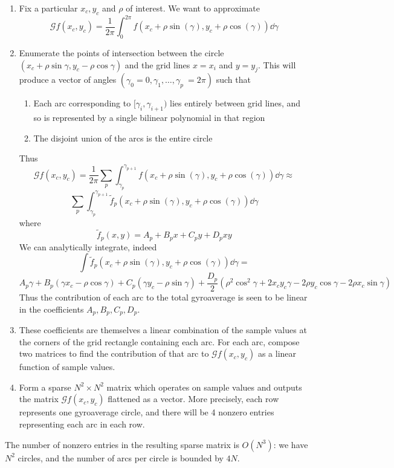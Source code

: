 \begin{enumerate}
	\item Fix a particular $x_c, y_c$ and $\rho$ of interest.  We want to approximate
\[	\mathcal{G}f(x_c,y_c) =  \frac{1}{2 \pi}\int_{0}^{2\pi} f(x_c+\rho \sin(\gamma), y_c + \rho \cos(\gamma)) \dd{\gamma} \]
\item Enumerate the points of intersection between the circle $(x_c + \rho \sin \gamma, y_c - \rho \cos \gamma)$ and the grid lines $x=x_i$ and $y=y_j$.  This will produce a vector of angles $(\gamma_0=0, \gamma_1, \dotsc, \gamma_p \ = 2 \pi)$  such that
\begin{enumerate}
	\item Each arc corresponding to $[\gamma_i,\gamma_{i+1})$ lies entirely between grid lines, and so is represented by a single bilinear polynomial in that region
	\item The disjoint union of the arcs is the entire circle
\end{enumerate}
Thus \[ \mathcal{G}f(x_c,y_c) =  \frac{1}{2 \pi} \sum_{p}\int_{\gamma_p}^{\gamma_{p+1}} f(x_c+\rho \sin(\gamma), y_c + \rho \cos(\gamma)) \dd{\gamma} \approx \]
\[  \sum_{p}\int_{\gamma_p}^{\gamma_{p+1}} \tilde{f}_p(x_c+\rho \sin(\gamma), y_c + \rho \cos(\gamma)) \dd{\gamma}\]
where 
\[ \tilde{f}_p(x,y) = A_p + B_p x +C_p y +D_p xy \]
We can analytically integrate, indeed
\[  \int \tilde{f}_p(x_c+\rho \sin(\gamma), y_c + \rho \cos(\gamma)) \dd{\gamma} = \] \[ A_p\gamma + B_p(\gamma x_c-\rho \cos \gamma) + C_p(\gamma y_c - \rho \sin \gamma) +
\frac{D_p}{2}(\rho^2 \cos^2 \gamma + 2 x_c y_c \gamma - 2 \rho y_c \cos \gamma - 2 \rho x_c \sin \gamma)  \]	
Thus the contribution of each arc to the total gyroaverage is seen to be linear in the coefficients $A_p, B_p, C_p, D_p$.  
\item These coefficients are themselves a linear combination of the sample values at the corners of the grid rectangle containing each arc.  For each arc, compose two matrices to find the contribution of that arc to $\mathcal{G}f(x_c,y_c)$ as a linear function of sample values.
\item Form a sparse $N^2 \times N^2$ matrix which operates on sample values and outputs the matrix $\mathcal{G}f(x_c,y_c)$ flattened as a vector.  More precisely, each row represents one gyroaverage circle, and there will be 4 nonzero entries representing each arc in each row.  
\end{enumerate}
The number of nonzero entries in the resulting sparse matrix is $O(N^3)$: we have $N^2$ circles, and the number of arcs per circle is bounded by $4N$.

